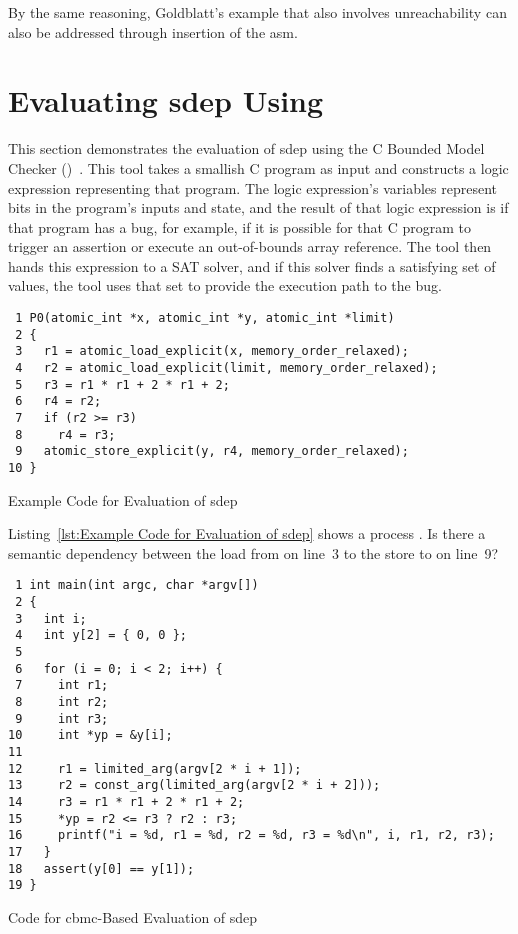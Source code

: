 \documentclass[10]{article}
\begin{document}
By the same reasoning, Goldblatt's  example that
also involves unreachability can also be addressed through insertion
of the asm.

\section{Evaluating sdep Using }
\label{sec:Evaluating sdep Using cbmc}

This section demonstrates the evaluation of sdep using
the C Bounded Model Checker
()~\cite{EdmundClarke2004CBMC}.
This tool takes a smallish C program as input and constructs a logic
expression representing that program.
The logic expression's variables represent bits in the program's inputs
and state, and the result of that logic expression is  if that
program has a bug, for example, if it is possible for that C program to
trigger an assertion or execute an out-of-bounds array reference.
The tool then hands this expression to a SAT solver, and if this solver
finds a satisfying set of values, the tool uses that set to provide
the execution path to the bug.

\begin{listing}[tbp]
\scriptsize
\begin{verbatim}
 1 P0(atomic_int *x, atomic_int *y, atomic_int *limit)
 2 {
 3   r1 = atomic_load_explicit(x, memory_order_relaxed);
 4   r2 = atomic_load_explicit(limit, memory_order_relaxed);
 5   r3 = r1 * r1 + 2 * r1 + 2;
 6   r4 = r2;
 7   if (r2 >= r3)
 8     r4 = r3;
 9   atomic_store_explicit(y, r4, memory_order_relaxed);
10 }
\end{verbatim}
\caption{Example Code for Evaluation of sdep}
\label{lst:Example Code for Evaluation of sdep}
\end{listing}

Listing~\ref{lst:Example Code for Evaluation of sdep}
shows a  process .
Is there a semantic dependency between the load from  on
line~3 to the store to  on line~9?

\begin{listing}[tbp]
\scriptsize
\begin{verbatim}
 1 int main(int argc, char *argv[])
 2 {
 3   int i;
 4   int y[2] = { 0, 0 };
 5
 6   for (i = 0; i < 2; i++) {
 7     int r1;
 8     int r2;
 9     int r3;
10     int *yp = &y[i];
11
12     r1 = limited_arg(argv[2 * i + 1]);
13     r2 = const_arg(limited_arg(argv[2 * i + 2]));
14     r3 = r1 * r1 + 2 * r1 + 2;
15     *yp = r2 <= r3 ? r2 : r3;
16     printf("i = %d, r1 = %d, r2 = %d, r3 = %d\n", i, r1, r2, r3);
17   }
18   assert(y[0] == y[1]);
19 }
\end{verbatim}
\caption{Code for cbmc-Based Evaluation of sdep}
\label{lst:Code for cbmc-Based Evaluation of sdep}
\end{listing}
\end{document}
